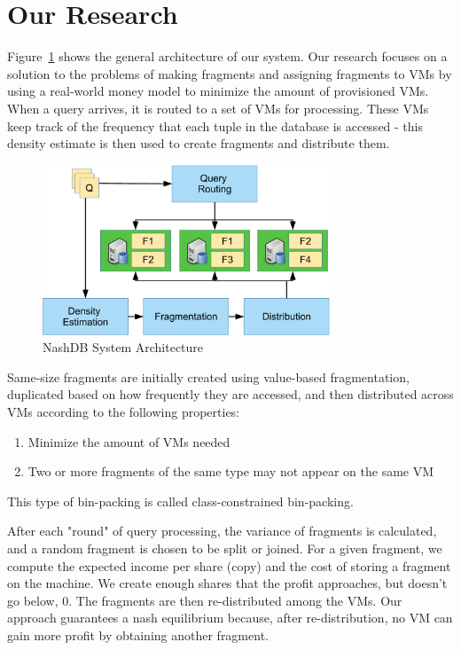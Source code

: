 \documentclass{brandiss}
\numberwithin{section}{chapter}
\numberwithin{figure}{chapter}
\theoremstyle{definition}
\theoremstyle{plain}
\theoremstyle{remark}
\begin{document}
\section{Our Research}

Figure~\ref{fig:nash} shows the general architecture of our system. Our research focuses on a solution to the problems of making fragments and assigning fragments to VMs by using a real-world money model to minimize the amount of provisioned VMs. When a query arrives, it is routed to a set of VMs for processing. These VMs keep track of the frequency that each tuple in the database is accessed - this density estimate is then used to create fragments and distribute them.

\begin{figure}[htbp]
  \centering
  \includegraphics[height=2in]{nash_sys}
  \caption{NashDB System Architecture}
  \label{fig:nash}
\end{figure}

Same-size fragments are initially created using value-based fragmentation, duplicated based on how frequently they are accessed, and then distributed across VMs according to the following properties:

\begin{enumerate}
\item Minimize the amount of VMs needed
\item Two or more fragments of the same type may not appear on the same VM
\end{enumerate}

This type of bin-packing is called class-constrained bin-packing.

After each "round" of query processing, the variance of fragments is calculated, and a random fragment is chosen to be split or joined. For a given fragment, we compute the expected income per share (copy) and the cost of storing a fragment on the machine. We create enough shares that the profit approaches, but doesn't go below, 0. The fragments are then re-distributed among the VMs. Our approach guarantees a nash equilibrium because, after re-distribution, no VM can gain more profit by obtaining another fragment.
\end{document}

